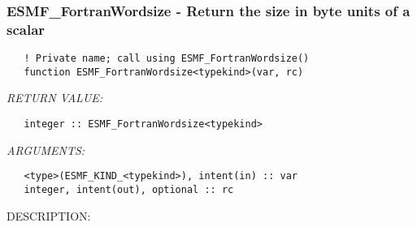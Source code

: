  
\setlength{\oldparskip}{\parskip}
\setlength{\parskip}{1.5ex}
\setlength{\oldparindent}{\parindent}
\setlength{\parindent}{0pt}
\setlength{\oldbaselineskip}{\baselineskip}
\setlength{\baselineskip}{11pt}
 
\def\bv{\begin{verbatim}}
\def\ev{\end{verbatim}}
\def\be{\begin{equation}}
\def\ee{\end{equation}}
\def\bea{\begin{eqnarray}}
\def\eea{\end{eqnarray}}
\def\bi{\begin{itemize}}
\def\ei{\end{itemize}}
\def\bn{\begin{enumerate}}
\def\en{\end{enumerate}}
\def\bd{\begin{description}}
\def\ed{\end{description}}
\def\({\left (}
\def\){\right )}
\def\[{\left [}
\def\]{\right ]}
\def\<{\left  \langle}
\def\>{\right \rangle}
\def\cI{{\cal I}}
\def\diag{\mathop{\rm diag}}
\def\tr{\mathop{\rm tr}}


 
\subsubsection [ESMF\_FortranWordsize] {ESMF\_FortranWordsize - Return the size in byte units of a scalar }


   
\begin{verbatim}   ! Private name; call using ESMF_FortranWordsize() 
   function ESMF_FortranWordsize<typekind>(var, rc) 
   \end{verbatim}{\em RETURN VALUE:}
\begin{verbatim}   integer :: ESMF_FortranWordsize<typekind> 
   \end{verbatim}{\em ARGUMENTS:}
\begin{verbatim}   <type>(ESMF_KIND_<typekind>), intent(in) :: var 
   integer, intent(out), optional :: rc 
   \end{verbatim}
{\sf DESCRIPTION:\\ }

